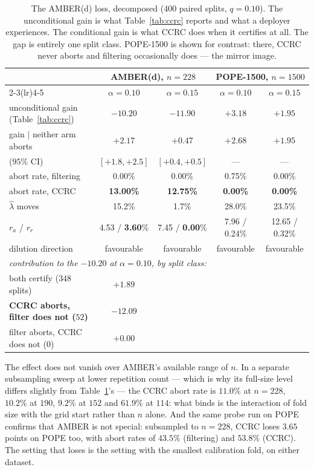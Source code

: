 \documentclass{article}
\theoremstyle{plain}
\theoremstyle{definition}
\theoremstyle{remark}
\begin{document}
\begin{table}[t]
\centering
\caption{The AMBER(d) loss, decomposed ($400$ paired splits, $q=0.10$). The unconditional gain
is what Table~\ref{tab:ccrc} reports and what a deployer experiences. The conditional gain is
what CCRC does when it certifies at all. The gap is entirely one split class. POPE-1500 is shown
for contrast: there, CCRC never aborts and filtering occasionally does --- the mirror image.}
\label{tab:amber}
\small
\begin{tabular}{lcccc}
\toprule
& \multicolumn{2}{c}{AMBER(d), $n=228$} & \multicolumn{2}{c}{POPE-1500, $n=1500$}\\
\cmidrule(lr){2-3}\cmidrule(lr){4-5}
& $\alpha=0.10$ & $\alpha=0.15$ & $\alpha=0.10$ & $\alpha=0.15$\\
\midrule
unconditional gain (Table~\ref{tab:ccrc}) & $-10.20$ & $-11.90$ & $+3.18$ & $+1.95$\\
gain $\mid$ neither arm aborts & $\mathbf{+2.17}$ & $\mathbf{+0.47}$ & $+2.68$ & $+1.95$\\
\quad ($95\%$ CI) & $[+1.8,+2.5]$ & $[+0.4,+0.5]$ & --- & ---\\
abort rate, filtering & 0.00\% & 0.00\% & 0.75\% & 0.00\%\\
abort rate, CCRC & \textbf{13.00\%} & \textbf{12.75\%} & \textbf{0.00\%} & \textbf{0.00\%}\\
$\hat\lambda$ moves & 15.2\% & 1.7\% & 28.0\% & 23.5\%\\
$r_a$ / $r_r$ & 4.53 / \textbf{3.60}\% & 7.45 / \textbf{0.00}\% & 7.96 / 0.24\% & 12.65 / 0.32\%\\
dilution direction & favourable & favourable & favourable & favourable\\
\midrule
\multicolumn{5}{l}{\emph{contribution to the $-10.20$ at $\alpha=0.10$, by split class:}}\\
\quad both certify ($348$ splits) & $+1.89$ & & &\\
\quad \textbf{CCRC aborts, filter does not ($52$)} & $\mathbf{-12.09}$ & & &\\
\quad filter aborts, CCRC does not ($0$) & $+0.00$ & & &\\
\bottomrule
\end{tabular}
\end{table}

The effect does not vanish over AMBER's available range of $n$. In a separate subsampling sweep
at lower repetition count --- which is why its full-size level differs slightly from
Table~\ref{tab:amber}'s --- the CCRC abort rate is $11.0\%$ at $n=228$, $10.2\%$ at $190$,
$9.2\%$ at $152$ and $61.9\%$ at $114$: what binds is the interaction of fold size with the grid
start rather than $n$ alone. And the same probe run on
POPE confirms that AMBER is not special: subsampled to $n=228$, CCRC loses $3.65$ points on POPE
too, with abort rates of $43.5\%$ (filtering) and $53.8\%$ (CCRC). The setting that loses is the
setting with the smallest calibration fold, on either dataset.
\end{document}
